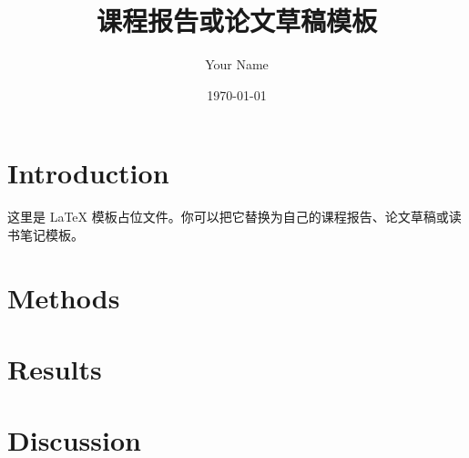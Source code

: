 \documentclass[12pt]{article}
\title{课程报告或论文草稿模板}
\author{Your Name}
\date{\today}
\begin{document}
\maketitle

\section{Introduction}

这里是 LaTeX 模板占位文件。你可以把它替换为自己的课程报告、论文草稿或读书笔记模板。

\section{Methods}

\section{Results}

\section{Discussion}
\end{document}
